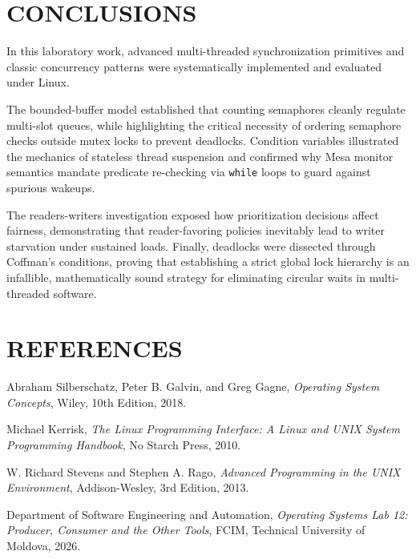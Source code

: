 \documentclass[12pt,a4paper]{report}
\numberwithin{equation}{chapter}
\numberwithin{figure}{chapter}
\numberwithin{table}{chapter}
\begin{document}
\chapter{CONCLUSIONS}
In this laboratory work, advanced multi-threaded synchronization primitives and classic concurrency patterns were systematically implemented and evaluated under Linux.

The bounded-buffer model established that counting semaphores cleanly regulate multi-slot queues, while highlighting the critical necessity of ordering semaphore checks outside mutex locks to prevent deadlocks. Condition variables illustrated the mechanics of stateless thread suspension and confirmed why Mesa monitor semantics mandate predicate re-checking via \texttt{while} loops to guard against spurious wakeups.

The readers-writers investigation exposed how prioritization decisions affect fairness, demonstrating that reader-favoring policies inevitably lead to writer starvation under sustained loads. Finally, deadlocks were dissected through Coffman's conditions, proving that establishing a strict global lock hierarchy is an infallible, mathematically sound strategy for eliminating circular waits in multi-threaded software.

\chapter*{REFERENCES}

\noindent [1] Abraham Silberschatz, Peter B. Galvin, and Greg Gagne, \textit{Operating System Concepts}, Wiley, 10th Edition, 2018.

\noindent [2] Michael Kerrisk, \textit{The Linux Programming Interface: A Linux and UNIX System Programming Handbook}, No Starch Press, 2010.

\noindent [3] W. Richard Stevens and Stephen A. Rago, \textit{Advanced Programming in the UNIX Environment}, Addison-Wesley, 3rd Edition, 2013.

\noindent [4] Department of Software Engineering and Automation, \textit{Operating Systems Lab 12: Producer, Consumer and the Other Tools}, FCIM, Technical University of Moldova, 2026.
\end{document}
